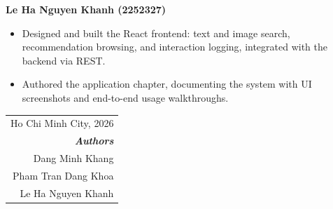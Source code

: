 \vspace{0.5em}

\noindent\textbf{Le Ha Nguyen Khanh (2252327)}

\begin{itemize}
    \item Designed and built the React frontend: text and image search, recommendation browsing, and interaction logging, integrated with the backend via REST.
    \item Authored the application chapter, documenting the system with UI screenshots and end-to-end usage walkthroughs.
\end{itemize}

\vspace{1.5cm}
\begin{flushright}
\begin{tabular}{r}
    Ho Chi Minh City, 2026 \\
    \textit{\textbf{Authors}} \\
    Dang Minh Khang \\
    Pham Tran Dang Khoa \\
    Le Ha Nguyen Khanh \\
\end{tabular}
\end{flushright}
